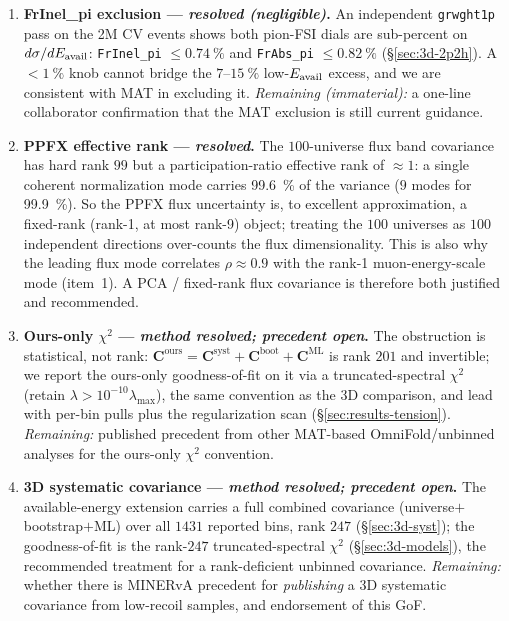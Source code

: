 \begin{enumerate}
  \item \textbf{FrInel\_pi exclusion --- \emph{resolved (negligible)}.} An
        independent \texttt{grwght1p} pass on the 2M CV events shows both pion-FSI
        dials are sub-percent on $d\sigma/dE_{\mathrm{avail}}$: \texttt{FrInel\_pi}
        $\le\SI{0.74}{\percent}$ and \texttt{FrAbs\_pi} $\le\SI{0.82}{\percent}$
        (\S\ref{sec:3d-2p2h}). A $<\SI{1}{\percent}$ knob cannot bridge the
        $7$--$\SI{15}{\percent}$ low-$E_{\mathrm{avail}}$ excess, and we are consistent with
        MAT in excluding it. \emph{Remaining (immaterial):} a one-line collaborator
        confirmation that the MAT exclusion is still current guidance.

  \item \textbf{PPFX effective rank --- \emph{resolved}.} The $100$-universe flux
        band covariance has hard rank $99$ but a participation-ratio effective rank
        of $\approx1$: a single coherent normalization mode carries
        \SI{99.6}{\percent} of the variance ($9$ modes for \SI{99.9}{\percent}).
        So the PPFX flux uncertainty is, to excellent approximation, a fixed-rank
        (rank-1, at most rank-9) object; treating the $100$ universes as $100$
        independent directions over-counts the flux dimensionality. This is also
        why the leading flux mode correlates $\rho\approx0.9$ with the rank-1
        muon-energy-scale mode (item~1). A PCA / fixed-rank flux covariance is
        therefore both justified and recommended.

  \item \textbf{Ours-only $\chi^{2}$ --- \emph{method resolved; precedent open}.}
        The obstruction is statistical, not rank: $\mathbf{C}^{\mathrm{ours}}=
        \mathbf{C}^{\mathrm{syst}}+\mathbf{C}^{\mathrm{boot}}+\mathbf{C}^{\mathrm{ML}}$
        is rank $201$ and invertible; we report the ours-only goodness-of-fit on it
        via a truncated-spectral $\chi^{2}$ (retain
        $\lambda>10^{-10}\lambda_{\max}$), the same convention as the 3D comparison,
        and lead with per-bin pulls plus the regularization scan
        (\S\ref{sec:results-tension}). \emph{Remaining:} published precedent from
        other MAT-based OmniFold/unbinned analyses for the ours-only $\chi^{2}$
        convention.

  \item \textbf{3D systematic covariance --- \emph{method resolved; precedent
        open}.} The available-energy extension carries a full combined covariance
        (universe$+$bootstrap$+$ML) over all $1431$ reported bins, rank $247$
        (\S\ref{sec:3d-syst}); the goodness-of-fit is the rank-$247$
        truncated-spectral $\chi^{2}$ (\S\ref{sec:3d-models}), the recommended
        treatment for a rank-deficient unbinned covariance. \emph{Remaining:}
        whether there is MINERvA precedent for \emph{publishing} a 3D systematic
        covariance from low-recoil samples, and endorsement of this GoF.


\end{enumerate}
